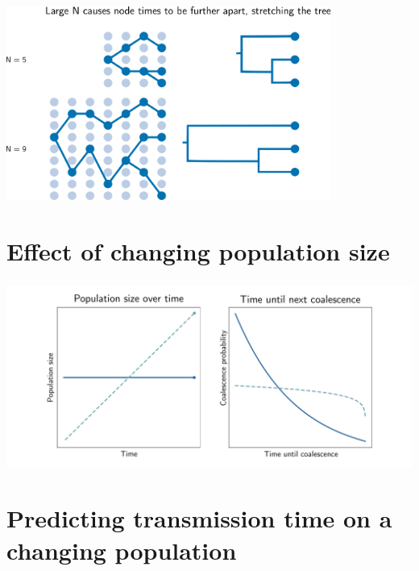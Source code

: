 \documentclass[aspectratio=169]{beamer}
\begin{document}
\begin{frame} \frametitle{\insertsection}

        \centering\includegraphics[width=0.8\textwidth]{images/coalescence}
        

\end{frame}

\section{Effect of changing population size}

\begin{frame} \frametitle{\insertsection}

    \centering\includegraphics[width=\textwidth]{images/population-comparison}
        

\end{frame}

\section{Predicting transmission time on a changing population}
\end{document}
